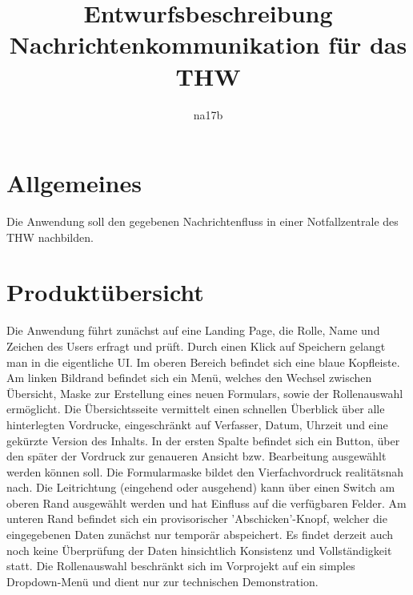 \documentclass[a4paper,11pt,oneside, titlepage]{article}
\title{Entwurfsbeschreibung\\Nachrichtenkommunikation für das THW}
\author{na17b}
\date{}
\begin{document}
\maketitle


\tableofcontents


\newpage


\section{Allgemeines}
Die Anwendung soll den gegebenen Nachrichtenfluss in einer Notfallzentrale des THW nachbilden.
\section{Produktübersicht}
Die Anwendung führt zunächst auf eine Landing Page, die Rolle, Name und Zeichen des Users erfragt und prüft. Durch einen Klick auf Speichern gelangt man in die eigentliche UI. Im oberen Bereich befindet sich eine blaue Kopfleiste. Am linken Bildrand befindet sich ein Menü, welches den Wechsel zwischen Übersicht, Maske zur Erstellung eines neuen Formulars, sowie der Rollenauswahl ermöglicht. Die Übersichtsseite vermittelt einen schnellen Überblick über alle hinterlegten Vordrucke, eingeschränkt auf Verfasser, Datum, Uhrzeit und eine gekürzte Version des Inhalts. In der ersten Spalte befindet sich ein Button, über den später der Vordruck zur genaueren Ansicht bzw. Bearbeitung ausgewählt werden können soll. Die Formularmaske bildet den Vierfachvordruck realitätsnah nach. Die Leitrichtung (eingehend oder ausgehend) kann über einen Switch am oberen Rand ausgewählt werden und hat Einfluss auf die verfügbaren Felder. Am unteren Rand befindet sich ein provisorischer 'Abschicken'-Knopf, welcher die eingegebenen Daten zunächst nur temporär abspeichert. Es findet derzeit auch noch keine Überprüfung der Daten hinsichtlich Konsistenz und Vollständigkeit statt. Die Rollenauswahl beschränkt sich im Vorprojekt auf ein simples Dropdown-Menü und dient nur zur technischen Demonstration.
\end{document}

